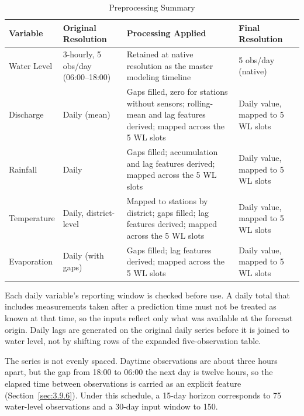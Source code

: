 \begin{table}[htbp]
  \centering
  \caption{Preprocessing Summary}
  \label{tab:3.4}
  \small
  \renewcommand{\arraystretch}{1.2}
  \begin{tabular}{@{}L{2.1cm} L{2.7cm} L{5.1cm} L{3.1cm}@{}}
    \toprule
    \textbf{Variable} & \textbf{Original Resolution} & \textbf{Processing Applied} & \textbf{Final Resolution} \\
    \midrule
    Water Level & 3-hourly, 5 obs/day (06:00--18:00) &
    Retained at native resolution as the master modeling timeline & 5 obs/day (native) \\

    Discharge & Daily (mean) &
    Gaps filled, zero for stations without sensors; rolling-mean and lag features derived; mapped across the 5 WL slots &
    Daily value, mapped to 5 WL slots \\

    Rainfall & Daily &
    Gaps filled; accumulation and lag features derived; mapped across the 5 WL slots &
    Daily value, mapped to 5 WL slots \\

    Temperature & Daily, district-level &
    Mapped to stations by district; gaps filled; lag features derived; mapped across the 5 WL slots &
    Daily value, mapped to 5 WL slots \\

    Evaporation & Daily (with gaps) &
    Gaps filled; lag features derived; mapped across the 5 WL slots &
    Daily value, mapped to 5 WL slots \\
    \bottomrule
  \end{tabular}
\end{table}

Each daily variable's reporting window is checked before use. A daily total
that includes measurements taken after a prediction time must not be treated as
known at that time, so the inputs reflect only what was available at the
forecast origin. Daily lags are generated on the original daily series before it
is joined to water level, not by shifting rows of the expanded
five-observation table.

The series is not evenly spaced. Daytime observations are about three hours
apart, but the gap from 18:00 to 06:00 the next day is twelve hours, so the
elapsed time between observations is carried as an explicit feature
(Section~\ref{sec:3.9.6}). Under this schedule, a 15-day horizon corresponds to
75 water-level observations and a 30-day input window to 150.

